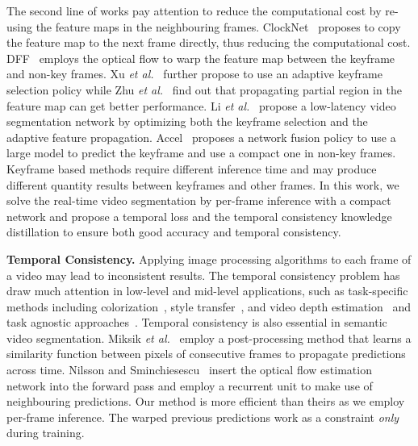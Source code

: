 \documentclass[runningheads]{llncs}
\newcommand{\etal}{\textit{et al.}}
\begin{document}
The second line of works
pay attention to reduce the computational cost by re-using the feature maps in the neighbouring frames. ClockNet~\cite{shelhamer2016clockwork} proposes to copy the feature map to the next frame directly,
thus reducing  the computational cost.
DFF~\cite{zhu2017deep} employs the optical flow to warp the feature map between the keyframe and non-key
frames.  Xu \etal ~\cite{xu2018dynamic} further propose to use an adaptive keyframe selection policy while Zhu \etal~\cite{zhu2018towards} find out that propagating partial region in the feature map can get better performance. Li \etal~\cite{li2018low} propose a low-latency video segmentation network by optimizing both the keyframe selection and the adaptive feature propagation. Accel~\cite{jain2019accel} proposes a network fusion policy to use a large model to predict the keyframe and use a compact one in
non-key
frames.
Keyframe based methods require different inference time and may produce different quantity results between keyframes and
other
frames.
In this work, we solve the real-time video segmentation by per-frame inference with
a
compact network and propose a temporal loss and the temporal consistency knowledge distillation to ensure both
good accuracy
and temporal consistency.



\noindent\textbf{Temporal Consistency.}
Applying image processing algorithms to each frame of a video may lead to inconsistent results. The temporal consistency problem has draw much attention in low-level and mid-level applications, such as task-specific methods including colorization~\cite{levin2004colorization}, style transfer~\cite{gupta2017characterizing}, and video depth estimation~\cite{bian2019unsupervised,bian2020unsupervised} and task
agnostic
approaches~\cite{lai2018learning,yao2017occlusion}.
Temporal consistency is also essential in semantic video segmentation.
Miksik \etal~\cite{miksik2013efficient} employ a post-processing method that learns a similarity function between pixels of consecutive frames to propagate predictions across time. Nilsson and Sminchiesescu~\cite{nilsson2018semantic} insert the optical flow estimation network into the forward pass and employ a recurrent unit to make use of neighbouring predictions. Our method is more efficient than
theirs
as we employ  per-frame inference.
The warped previous predictions work as a constraint
\textit{only} during training.
\end{document}
